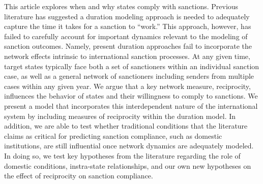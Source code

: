 This article explores when and why states comply with sanctions. Previous literature has suggested a duration modeling approach is needed to adequately capture the time it takes for a sanction to ``work.'' This approach, however, has failed to carefully account for important dynamics relevant to the modeling of sanction outcomes. Namely, present duration approaches fail to incorporate the network effects intrinsic to international sanction processes. At any given time, target states typically face both a set of sanctioners within an individual sanction case, as well as a general network of sanctioners including senders from multiple cases within any given year. We argue that a key network measure, reciprocity, influences the behavior of states and their willingness to comply to sanctions. We present a model that incorporates this interdependent nature of the international system by including measures of reciprocity within the duration model. In addition, we are able to test whether traditional conditions that the literature claims as critical for predicting sanction compliance, such as domestic institutions, are still influential once network dynamics are adequately modeled. In doing so, we test key hypotheses from the literature regarding the role of domestic conditions, instra-state relationships, and our own new hypotheses on the effect of reciprocity on sanction compliance. 